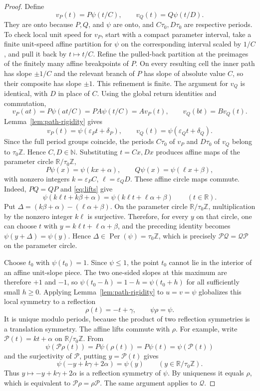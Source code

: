 \documentclass[11pt]{article}
\begin{document}
\begin{proof}
Define
\[
v_P(t)=P\psi(t/C),\qquad v_Q(t)=Q\psi(t/D).
\]
They are onto because $P,Q$, and $\psi$ are onto, and $C\tau_0,D\tau_0$ are respective periods.
To check local unit speed for $v_P$, start with a compact parameter
interval, take a finite unit-speed affine partition for $\psi$ on the corresponding interval scaled by
$1/C$, and pull it back by $t\mapsto t/C$. Refine the pulled-back partition at the preimages of the
finitely many affine breakpoints of $P$. On every resulting cell the inner path has slope $\pm1/C$ and
the relevant branch of $P$ has slope of absolute value $C$, so their composite has slope $\pm1$.
This refinement is finite. The argument for $v_Q$ is identical, with $D$ in place of $C$. Using the
global return identities and commutation,
\[
v_P(at)=P\psi(at/C)=PA\psi(t/C)=A v_P(t),
\qquad
v_Q(bt)=B v_Q(t).
\]
Lemma~\ref{lem:path-rigidity} gives
\[
v_P(t)=\psi(\varepsilon_Pt+\delta_P),\qquad
v_Q(t)=\psi(\varepsilon_Qt+\delta_Q).
\]
Since the full period groups coincide, the periods $C\tau_0$ of $v_P$ and $D\tau_0$ of $v_Q$ belong
to $\tau_0\mathbb Z$. Hence $C,D\in\mathbb N$. Substituting $t=Cx,Dx$ produces affine maps of the
parameter circle $\mathbb R/\tau_0\mathbb Z$,
\begin{equation}\label{eq:lifts}
P\psi(x)=\psi(kx+\alpha),\qquad Q\psi(x)=\psi(\ell x+\beta),
\end{equation}
with nonzero integers $k=\varepsilon_PC$, $\ell=\varepsilon_QD$. These affine circle maps commute.
Indeed, $PQ=QP$ and \eqref{eq:lifts} give
\[
\psi(k\ell t+k\beta+\alpha)=\psi(k\ell t+\ell\alpha+\beta)\qquad(t\in\mathbb R).
\]
Put $\Delta=(k\beta+\alpha)-(\ell\alpha+\beta)$. On the parameter circle
$\mathbb R/\tau_0\mathbb Z$, multiplication by the nonzero integer $k\ell$ is surjective. Therefore, for
every $y$ on that circle, one can choose $t$ with
$y=k\ell t+\ell\alpha+\beta$, and the preceding identity becomes
$\psi(y+\Delta)=\psi(y)$. Hence $\Delta\in\operatorname{Per}(\psi)=\tau_0\mathbb Z$, which is
precisely $\mathcal P\mathcal Q=\mathcal Q\mathcal P$ on the parameter circle.

Choose $t_0$ with $\psi(t_0)=1$. Since $\psi\le1$, the point $t_0$ cannot lie in the interior of an
affine unit-slope piece. The two one-sided slopes at this maximum are therefore $+1$ and $-1$, so
$\psi(t_0-h)=1-h=\psi(t_0+h)$ for all sufficiently small $h\ge0$. Applying
Lemma~\ref{lem:path-rigidity} to $u=v=\psi$ globalizes this local symmetry to a reflection
\[
\rho(t)=-t+\gamma,\qquad \psi\rho=\psi.
\]
It is unique modulo periods, because the product of two reflection symmetries is a translation symmetry.
The affine lifts commute with $\rho$. For example, write
$\mathcal P(t)=kt+\alpha$ on $\mathbb R/\tau_0\mathbb Z$. From
\[
\psi(\mathcal P\rho(t))=P\psi(\rho(t))=P\psi(t)=\psi(\mathcal P(t))
\]
and the surjectivity of $\mathcal P$, putting $y=\mathcal P(t)$ gives
\[
\psi(-y+k\gamma+2\alpha)=\psi(y)\qquad(y\in\mathbb R/\tau_0\mathbb Z).
\]
Thus $y\mapsto-y+k\gamma+2\alpha$ is a reflection symmetry of $\psi$. By uniqueness it equals
$\rho$, which is equivalent to $\mathcal P\rho=\rho\mathcal P$. The same argument applies to
$\mathcal Q$.


\end{proof}
\end{document}

